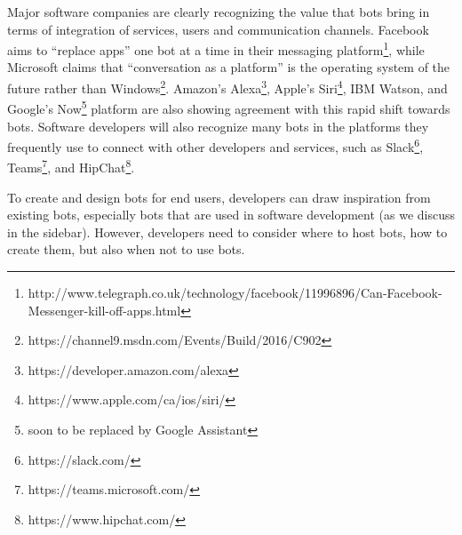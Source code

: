 \documentclass{sig-alternate}
\begin{document}
Major software companies are clearly recognizing the value that bots bring in terms of integration of services, users and communication channels. Facebook aims to ``replace apps'' one bot at a time in their messaging platform\footnote{http://www.telegraph.co.uk/technology/facebook/11996896/Can-Facebook-Messenger-kill-off-apps.html}, while Microsoft claims that ``conversation as a platform'' is the operating system of the future rather than Windows\footnote{https://channel9.msdn.com/Events/Build/2016/C902}. 
Amazon's Alexa\footnote{https://developer.amazon.com/alexa\label{Alexa}}, Apple's Siri\footnote{https://www.apple.com/ca/ios/siri/\label{Siri}}, IBM Watson, and Google's Now\footnote{soon to be replaced by Google Assistant} platform are also showing agreement with this rapid shift towards bots. 
Software developers will also recognize many bots in the platforms they frequently use to connect with other developers and services, such as Slack\footnote{https://slack.com/\label{Slack}}, Teams\footnote{https://teams.microsoft.com/\label{Teams}}, and HipChat\footnote{https://www.hipchat.com/\label{Hipchat}}. 


To create and design bots for end users, developers can draw inspiration from existing bots, especially bots that are used in software development (as we discuss in the sidebar). 
However, developers need to consider where to host bots, how to create them, but also when not to use bots. 
\end{document}
